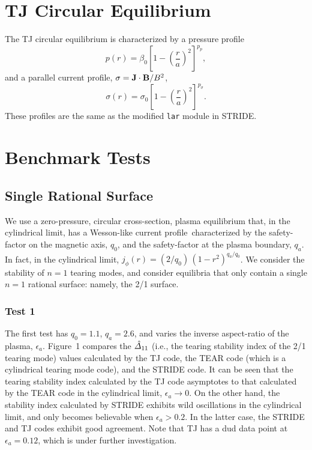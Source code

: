 \documentclass[12pt,prb,aps,notitlepage]{revtex4-1}
\begin{document}
\section{TJ Circular Equilibrium}
The TJ circular equilibrium is characterized by a pressure profile
\begin{equation}
p(r)= \beta_0\left[1-\left(\frac{r}{a}\right)^2\right]^{p_p},
\end{equation}
and a parallel current profile, $\sigma={\bf J}\cdot{\bf B}/B^2$, 
\begin{equation}
\sigma(r) = \sigma_0\left[1-\left(\frac{r}{a}\right)^2\right]^{p_\sigma}.
\end{equation}
These profiles are the same as the  modified {\tt lar} module in STRIDE.

\section{Benchmark Tests}
\subsection{Single Rational Surface}
We use a zero-pressure, circular cross-section,  plasma equilibrium that, in the cylindrical limit, has a Wesson-like current profile\,\cite{wesson} characterized by the
safety-factor on the magnetic axis, $q_0$, and the safety-factor at the plasma boundary, $q_a$. In fact, in the cylindrical limit, $j_\phi(r)= (2/q_0)\, (1-r^2)^{q_a/q_0}$. 
We consider the stability of $n=1$ tearing modes, and
consider equilibria that only contain a single $n=1$ rational surface: namely, the 2/1 surface. 

\subsubsection{Test 1}
The first test has $q_0=1.1$, $q_a=2.6$, and varies the inverse aspect-ratio of the plasma, $\epsilon_a$. Figure~1 compares the $\hat{\mit\Delta}_{11}$ (i.e.,
the tearing stability index of the 2/1 tearing mode) values calculated by the TJ code,\cite{tj} the TEAR code (which is a cylindrical tearing mode code), and
the STRIDE code. It can be seen that the tearing stability index calculated by the TJ code asymptotes to that calculated by the TEAR code
in the cylindrical limit, $\epsilon_a\rightarrow 0$. On the other hand, the stability index calculated by STRIDE exhibits wild oscillations in
the cylindrical limit, and only becomes believable when $\epsilon_a>0.2$. In the latter case, the STRIDE and TJ codes exhibit good agreement. 
Note that TJ has a dud data point at $\epsilon_a=0.12$, which is under further investigation. 
\end{document}

